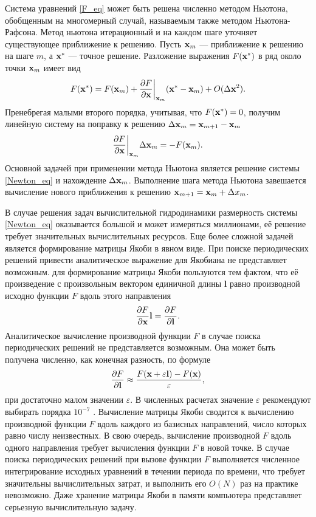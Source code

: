 Система уравнений \eqref{F_eq} может быть решена численно методом Ньютона, обобщенным на многомерный случай, называемым также методом Ньютона-Рафсона. Метод ньютона итерационный и на каждом шаге уточняет существующее приближение к решению. Пусть $\mathbf{x}_m$ --- приближение к решению на шаге $m$, а $\mathbf{x}^*$ --- точное решение. Разложение выражения $F(\mathbf{x}^*)$ в ряд около точки $\mathbf{x}_m$ имеет вид
\begin{equation}
F(\mathbf{x}^*) = F(\mathbf{x}_m) + \frac{\partial F}{\partial \mathbf{x}}\bigg|_{\mathbf{x}_m} (\mathbf{x}^* - \mathbf{x}_m) + O(\Delta \mathbf{x}^2). 
\end{equation}
Пренебрегая малыми второго порядка, учитывая, что $F(\mathbf{x}^*) = 0$, получим линейную систему на поправку к решению $\Delta \mathbf{x}_m = \mathbf{x}_{m+1} - \mathbf{x}_m$
\begin{equation}\label{Newton_eq}
\frac{\partial F}{\partial \mathbf{x}}\bigg|_{\mathbf{x}_m} \Delta \mathbf{x}_m = - F(\mathbf{x}_m). 
\end{equation}
Основной задачей при применении метода Ньютона является решение системы \eqref{Newton_eq} и нахождение $\Delta \mathbf{x}_m$. Выполнение шага метода Ньютона завешается вычисление нового приближения к решению $\mathbf{x}_{m+1} = \mathbf{x}_m + \Delta x_m$. 


\def\l{\mathbf{l}}
В случае решения задач вычислительной гидродинамики размерность системы \eqref{Newton_eq} оказывается большой и может измеряться миллионами, её решение требует значительных вычислительных ресурсов. Еще более сложной задачей является формирование матрицы Якоби в явном виде. При поиске периодических решений привести аналитическое выражение для Якобиана не представляет возможным. для формирование матрицы Якоби пользуются тем фактом, что её произведение с произвольным вектором единичной длины $\l$ равно производной исходно функции $F$ вдоль этого направления
\begin{equation} \label{Jl_eq}
\pd{F}{\x} \l = \pd{F}{\l}. 
\end{equation}
Аналитическое вычисление производной функции $F$ в случае поиска периодических решений не представляется возможным. 
Она может быть получена численно, как конечная разность, по формуле
\begin{equation}\label{fd_eq}
\pd{F}{\l} \approx \frac{F(\x + \varepsilon \l) - F(\x)}{\varepsilon},
\end{equation}
при достаточно малом значении $\varepsilon$. В численных расчетах значение $\varepsilon$ рекомендуют выбирать порядка $10^{-7}$ \cite{Viswanath2007}. Вычисление матрицы Якоби сводится к вычислению производной функции $F$ вдоль каждого из базисных направлений, число которых равно числу неизвестных. В свою очередь, вычисление производной $F$ вдоль одного направления требует вычисления функции $F$ в новой точке. В случае поиска периодических решений при вызове функции $F$ выполняется численное интегрирование исходных уравнений в течении периода по времени, что требует значительны вычислительных затрат, и выполнить его $O(N)$ раз на практике невозможно. Даже хранение матрицы Якоби в памяти компьютера представляет серьезную вычислительную задачу.

